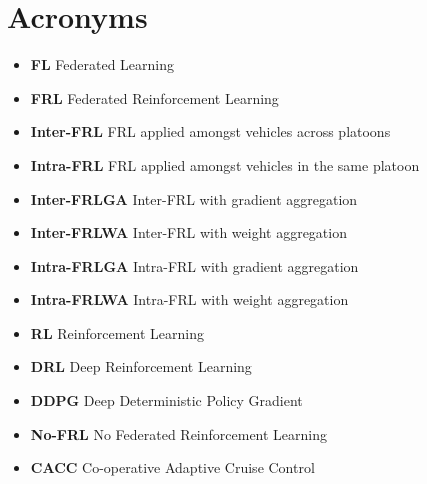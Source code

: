 \documentclass[oneside, 12pt]{book}
\begin{document}
\chapter*{Acronyms}
\begin{itemize}[label={}]
	\singlespacing
	\item \textbf{FL} Federated Learning \\
	\item \textbf{FRL} Federated Reinforcement Learning \\
	\item \textbf{Inter-FRL}  FRL applied amongst vehicles across platoons \\
	\item \textbf{Intra-FRL}  FRL applied amongst vehicles in the same platoon \\
	\item \textbf{Inter-FRLGA} Inter-FRL with gradient aggregation \\
	\item \textbf{Inter-FRLWA} Inter-FRL with weight aggregation \\
	\item \textbf{Intra-FRLGA} Intra-FRL with gradient aggregation \\
	\item \textbf{Intra-FRLWA} Intra-FRL with weight aggregation \\
	\item \textbf{RL} Reinforcement Learning \\
	\item \textbf{DRL} Deep Reinforcement Learning \\
	\item \textbf{DDPG} Deep Deterministic Policy Gradient \\
	\item \textbf{No-FRL}  No Federated Reinforcement Learning \\
	\item \textbf{CACC} Co-operative Adaptive Cruise Control
\end{itemize}
\doublespacing









\end{document}

